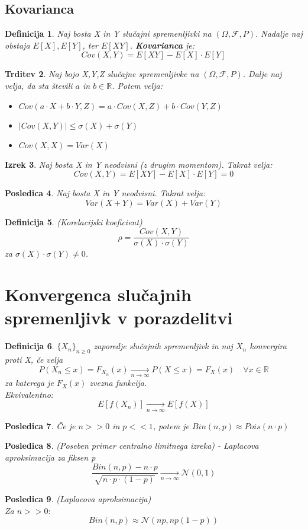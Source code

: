 \documentclass[11pt]{article}
\newtheorem{Izrek}{{\sc Izrek}}[section]
\newtheorem{Trditev}[Izrek]{{\sc Trditev}}
\newtheorem{Posledica}[Izrek]{{\sc Posledica}}
\newtheorem{Definicija}[Izrek]{{\sc Definicija}}
\begin{document}
\subsection{Kovarianca}
\begin{Definicija}
Naj bosta X in Y slučajni spremenljivki na $(\Omega,\mathcal{F},P)$. Nadalje naj obstaja $E[X], E[Y]$, ter $E[XY]$. \textbf{Kovarianca} je:
$$Cov(X,Y) = E[XY] - E[X] \cdot E[Y]$$
\end{Definicija}
\begin{Trditev} 
Naj bojo X,Y,Z slučajne spremenljivke na  $(\Omega,\mathcal{F},P)$. Dalje naj velja, da sta števili $a$ in $b\in \mathbb{R}$. Potem velja:
\begin{itemize}
\item
$Cov(a\cdot X + b\cdot Y, Z) = a \cdot Cov(X,Z) + b\cdot Cov(Y,Z)$
\item
$|Cov(X,Y)| \le \sigma (X) + \sigma (Y)$
\item
$Cov(X,X) = Var(X)$
\end{itemize}
\end{Trditev}
\begin{Izrek}
Naj bosta X in Y neodvisni (z drugim momentom). Takrat velja:
$$Cov(X,Y) = E[XY] - E[X] \cdot E[Y] = 0$$
\end{Izrek}
\begin{Posledica}
Naj bosta X in Y neodvisni. Takrat velja:
$$Var(X + Y) = Var(X) + Var(Y)$$
\end{Posledica}
\begin{Definicija}
(Korelacijski koeficient)
$$\rho  = \frac{Cov(X,Y)}{\sigma (X) \cdot \sigma (Y)}$$
za $\sigma (X) \cdot \sigma (Y) \neq 0$.
\end{Definicija}
\section{Konvergenca slučajnih spremenljivk v porazdelitvi}
\begin{Definicija}
$ \{ X_n\}_{n \ge 0}$ zaporedje slučajnih spremenljivk in naj $ X_n$ konvergira proti X, če velja $$P(X_n \le x) = F_{X_n}(x)\xrightarrow[n\to \infty]{}  P(X \le x) = F_X(x) \quad \forall x \in \mathbb{R}$$ za katerega je $F_X(x)$ zvezna funkcija.
\\
Ekvivalentno:
$$E[f(X_n)]  \xrightarrow[n\to \infty]{} E[f(X)]$$
\end{Definicija}
\begin{Posledica}
Če je $n >>0$ in $p << 1$, potem je $Bin(n,p) \approx Pois(n\cdot p)$
\end{Posledica}
\begin{Posledica} (Poseben primer centralno limitnega izreka) - Laplacova aproksimacija za fiksen p
$$\frac{Bin(n,p) - n\cdot p}{\sqrt{n\cdot p \cdot (1-p)}} \xrightarrow[n\to \infty]{}  \mathcal{N}(0,1)$$
\end{Posledica}
\begin{Posledica} (Laplacova aproksimacija)
\\
Za $n>> 0:$
$$Bin(n,p) \approx \mathcal{N}({n p, np(1-p)})$$
\end{Posledica}
\end{document}
